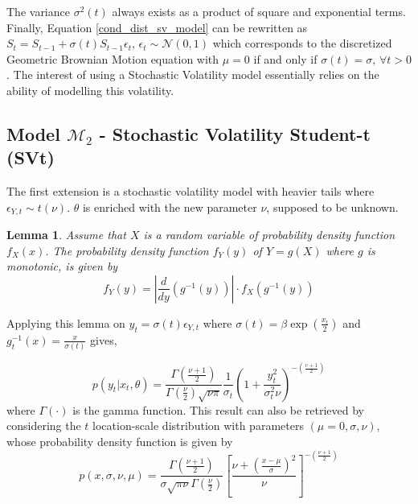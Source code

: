 \documentclass[11pt,a4,twosided,singlespacing,titlepagenumber=on]{scrreprt}
\numberwithin{equation}{chapter} %
\newtheorem{lemma}[theorem]{Lemma}%
\theoremstyle{remark}
\begin{document}
The variance $\sigma^2(t)$ always exists as a product of square and exponential terms. Finally, Equation \ref{cond_dist_sv_model} can be rewritten as $S_t = S_{t-1} + \sigma(t) S_{t-1} \epsilon_t \text{, } \epsilon_t \sim \mathcal{N}(0,1)$ which corresponds to the discretized Geometric Brownian Motion equation with $\mu = 0$ if and only if $\sigma(t) = \sigma \text{, } \forall t > 0$. The interest of using a Stochastic Volatility model essentially relies on the ability of modelling this volatility.

\subsection{Model $\mathcal{M}_2$ - Stochastic Volatility Student-t (SVt)}
The first extension is a stochastic volatility model with heavier tails where $\epsilon_{Y,t} \sim t(\nu)$. $\theta$ is enriched with the new parameter $\nu$, supposed to be unknown.

\begin{lemma}
\textit{
Assume that $X$ is a random variable of probability density function $f_X(x)$. The probability density function $f_Y(y)$ of $Y=g(X)$ where $g$ is monotonic, is given by
}
\begin{equation}
f_Y(y) = \left|\frac{d}{dy}(g^{-1}(y))\right| \cdot f_X(g^{-1}(y))
\end{equation}
\end{lemma}


Applying this lemma on $y_t = \sigma(t) \epsilon_{Y,t}$ where $\sigma(t) = \beta \exp \left(\frac{x_t}{2} \right)$ and $g^{-1}_t(x) = \frac{x}{\sigma(t)}$ gives,

\begin{equation}
p(y_t | x_t, \theta) = \frac{\Gamma(\frac{\nu+1}{2})}{\Gamma(\frac{\nu}{2}) \sqrt{\nu\pi}} \frac{1}{\sigma_t}\left( 1 + \frac{y_t^2}{\sigma_t^2 \nu}\right)^{-\left(\frac{v+1}{2} \right)}
\end{equation}
where $\Gamma(\cdot)$ is the gamma function. This result can also be retrieved by considering the $t$ location-scale distribution with parameters $(\mu = 0, \sigma, \nu)$, whose probability density function is given by
\begin{equation}
p(x,\sigma,\nu,\mu) = \frac{\Gamma \left(\frac{\nu+1}{2} \right)}{\sigma \sqrt{\pi \nu} \Gamma \left(\frac{\nu}{2} \right)} \left[ \frac{\nu + \left( \frac{x-\mu}{\sigma}\right)^2}{\nu}\right]^{-\left(\frac{\nu+1}{2} \right)}
\end{equation}
\end{document}
